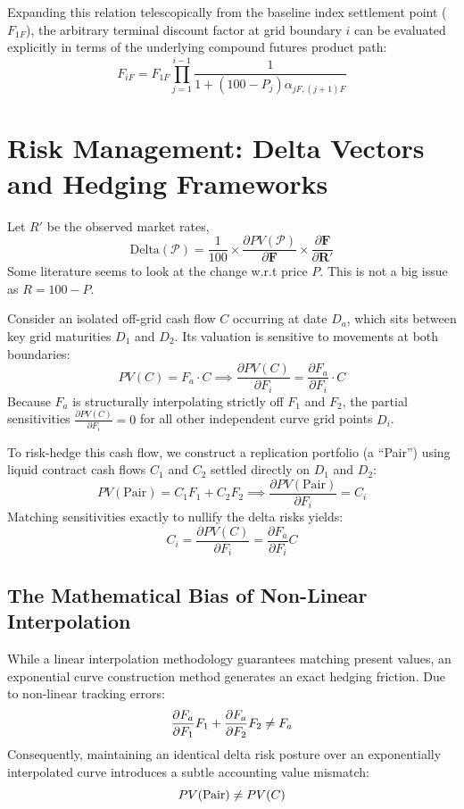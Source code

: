 \documentclass{article}
\begin{document}
Expanding this relation telescopically from the baseline index settlement point ($F_{1F}$), the arbitrary terminal discount factor at grid boundary $i$ can be evaluated explicitly in terms of the underlying compound futures product path:
\begin{equation}
    F_{iF} = F_{1F} \prod_{j=1}^{i-1} \frac{1}{1 + (100 - P_j)\alpha_{jF,(j+1)F}} \tag{8.32}
\end{equation}


\section{Risk Management: Delta Vectors and Hedging Frameworks}

Let $R'$ be the observed market rates,
\[\text{Delta}(\mathcal{P})=\frac{1}{100}\times \frac{\partial PV(\mathcal{P})}{\partial \textbf{F}} \times \frac{\partial \textbf{F}}{\partial \textbf{R}'}\]
Some literature seems to look at the change w.r.t price $P$. This is not a big issue as $R=100-P$.

Consider an isolated off-grid cash flow $C$ occurring at date $D_a$, which sits between key grid maturities $D_1$ and $D_2$. Its valuation is sensitive to movements at both boundaries:
\begin{equation}
    PV(C) = F_a \cdot C \implies \frac{\partial PV(C)}{\partial F_i} = \frac{\partial F_a}{\partial F_i} \cdot C
\end{equation}
Because $F_a$ is structurally interpolating strictly off $F_1$ and $F_2$, the partial sensitivities $\frac{\partial PV(C)}{\partial F_i} = 0$ for all other independent curve grid points $D_i$.

To risk-hedge this cash flow, we construct a replication portfolio (a ``Pair'') using liquid contract cash flows $C_1$ and $C_2$ settled directly on $D_1$ and $D_2$:
\begin{equation}
    PV(\text{Pair}) = C_1 F_1 + C_2 F_2 \implies \frac{\partial PV(\text{Pair})}{\partial F_i} = C_i
\end{equation}
Matching sensitivities exactly to nullify the delta risks yields:
\begin{equation}
    C_i = \frac{\partial PV(C)}{\partial F_i} = \frac{\partial F_a}{\partial F_i} C
\end{equation}

\subsection{The Mathematical Bias of Non-Linear Interpolation}
While a linear interpolation methodology guarantees matching present values, an exponential curve construction method generates an exact hedging friction. Due to non-linear tracking errors:
\begin{equation}
    \frac{\partial F_a}{\partial F_1} F_1 + \frac{\partial F_a}{\partial F_2} F_2 \centernot= F_a
\end{equation}
Consequently, maintaining an identical delta risk posture over an exponentially interpolated curve introduces a subtle accounting value mismatch:
\begin{equation}
    PV(\text{Pair}) \centernot= PV(C)
\end{equation}
\end{document}

